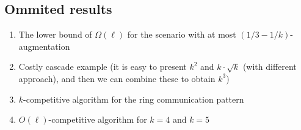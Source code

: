 \documentclass[manuscript,screen=true]{acmart}
\newcommand{\todo}[1]{\noindent\color{brown}{todo: #1}\color{black}}
\begin{document}
\todo{Sum up all the steps needed for the submission}

\todo{ACM keywords are mandatory}

\todo{CCS concepts are mandatory}

\todo{$. \rightarrow \cdot$}

\todo{Font for OPT, ALG, DET, dist etc}


  

\begin{appendix}
	\section{Ommited results}
	\begin{enumerate}
		 \item The lower bound of $\Omega(\ell)$ for the scenario with at most $(1/3-1/k)$-augmentation
		 \item Costly cascade example (it is easy to present $k^2$ and $k\cdot \sqrt{k}$ (with different approach), and then we can combine these to obtain $k^3$)
		 \item $k$-competitive algorithm for the ring communication pattern
		 \item $O(\ell)$-competitive algorithm for $k=4$ and $k=5$
	\end{enumerate}

\end{appendix}
\end{document}

